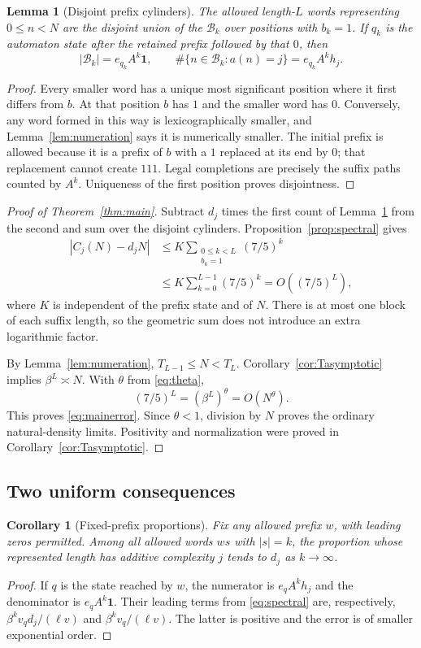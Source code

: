 \documentclass[11pt,a4paper]{article}
\newtheorem{lemma}[theorem]{Lemma}
\newtheorem{corollary}[theorem]{Corollary}
\theoremstyle{definition}
\theoremstyle{remark}
\newcommand{\one}{\mathbf 1}
\newcommand{\cyl}{\mathcal B}
\begin{document}
\begin{lemma}[Disjoint prefix cylinders]\label{lem:cylinders}
The allowed length-$L$ words representing $0\le n<N$ are the disjoint union
of the $\cyl_k$ over positions with $b_k=1$. If $q_k$ is the automaton state
after the retained prefix followed by that $0$, then
\[
 |\cyl_k|=e_{q_k}A^k\one,
 \qquad
 \#\{n\in\cyl_k:a(n)=j\}=e_{q_k}A^kh_j.
\]
\end{lemma}
\begin{proof}
Every smaller word has a unique most significant position where it first
differs from $b$. At that position $b$ has $1$ and the smaller word has
$0$. Conversely, any word formed in this way is lexicographically smaller,
and Lemma~\ref{lem:numeration} says it is numerically smaller. The initial
prefix is allowed because it is a prefix of $b$ with a $1$ replaced at its
end by $0$; that replacement cannot create $111$. Legal completions are
precisely the suffix paths counted by $A^k$. Uniqueness of the first
position proves disjointness.
\end{proof}

\begin{proof}[Proof of Theorem~\ref{thm:main}]
Subtract $d_j$ times the first count of Lemma~\ref{lem:cylinders} from the
second and sum over the disjoint cylinders. Proposition~\ref{prop:spectral}
gives
\begin{align*}
 |C_j(N)-d_jN|
 &\le K\sum_{\substack{0\le k<L\\b_k=1}}(7/5)^k\\
 &\le K\sum_{k=0}^{L-1}(7/5)^k
 =O((7/5)^L),
\end{align*}
where $K$ is independent of the prefix state and of $N$.
There is at most one block of each suffix length, so the geometric sum
does not introduce an extra logarithmic factor.

By Lemma~\ref{lem:numeration},
$T_{L-1}\le N<T_L$. Corollary~\ref{cor:Tasymptotic} implies
$\beta^L\asymp N$. With $\theta$ from \eqref{eq:theta},
\[
 (7/5)^L=(\beta^L)^\theta=O(N^\theta).
\]
This proves \eqref{eq:mainerror}. Since $\theta<1$, division by $N$
proves the ordinary natural-density limits. Positivity and normalization
were proved in Corollary~\ref{cor:Tasymptotic}.
\end{proof}

\subsection{Two uniform consequences}
\begin{corollary}[Fixed-prefix proportions]\label{cor:prefix}
Fix any allowed prefix $w$, with leading zeros permitted. Among all allowed
words $ws$ with $|s|=k$, the proportion whose represented length has
additive complexity $j$ tends to $d_j$ as $k\to\infty$.
\end{corollary}
\begin{proof}
If $q$ is the state reached by $w$, the numerator is $e_qA^kh_j$ and the
denominator is $e_qA^k\one$. Their leading terms from
\eqref{eq:spectral} are, respectively,
$\beta^kv_qd_j/(\ell v)$ and $\beta^kv_q/(\ell v)$.
The latter is positive and the error is of smaller exponential order.
\end{proof}
\end{document}
